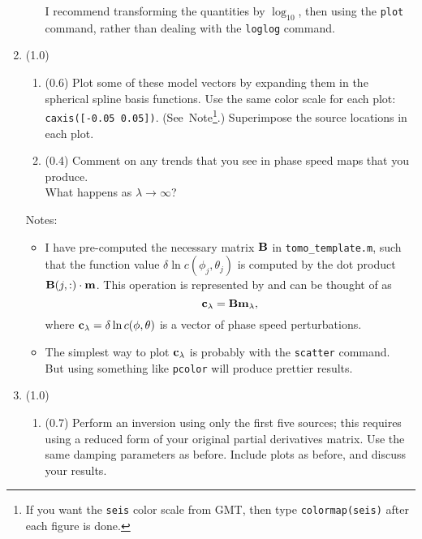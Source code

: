 \documentclass[11pt,titlepage,fleqn]{article}
\begin{document}
\begin{enumerate}
\begin{enumerate}
I recommend transforming the quantities by $\log_{10}$, then using the \verb+plot+ command, rather than dealing with the \verb+loglog+ command.

\end{enumerate}


\item (1.0) 

\begin{enumerate}
\item (0.6) Plot some of these model vectors by expanding them in the spherical spline basis functions. Use the same color scale for each plot: \verb+caxis([-0.05 0.05])+. (See~Note\footnote{If you want the {\tt seis} color scale from GMT, then type {\tt colormap(seis)} after each figure is done.}.) Superimpose the source locations in each plot.

\item (0.4) Comment on any trends that you see in phase speed maps that you produce. \\
What happens as $\lambda \rightarrow \infty$?
\end{enumerate}

Notes:
%
\begin{itemize}
\item I have pre-computed the necessary matrix $\mbox{${\bf B}$}$ in \verb+tomo_template.m+, such that the function value $\delta\ln c(\phi_j, \theta_j)$ is computed by the dot product $\mbox{${\bf B}$}(j,:) \cdot \mbox{${\bf m}$}$. This operation is represented by  and can be thought of as
%
\begin{equation}
\mbox{${\bf c}$}_{\lambda} = \mbox{${\bf B}$} \mbox{${\bf m}$}_{\lambda},
\end{equation}
%
where $\mbox{${\bf c}$}_{\lambda} = \delta\ln c(\phi, \theta)$ is a vector of phase speed perturbations.

\item The simplest way to plot $\mbox{${\bf c}$}_{\lambda}$ is probably with the \verb+scatter+ command. \\ But using something like \verb+pcolor+ will produce prettier results.

\end{itemize}

\item (1.0)
%
\begin{enumerate}
\item (0.7) Perform an inversion using only the first five sources; this requires using a reduced form of your original partial derivatives matrix. Use the same damping parameters as before. Include plots as before, and discuss your results.


\end{enumerate}
\end{enumerate}
\end{document}
